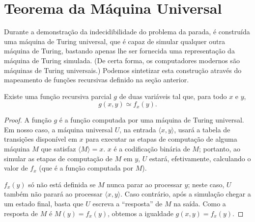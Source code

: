 \section{Teorema da Máquina Universal}
\label{sec:universal_turing_machine}

Durante a demonstração da indecidibilidade do problema da parada,
é construída uma máquina de Turing universal,
que é capaz de simular qualquer outra máquina de Turing,
bastando apenas lhe ser fornecida uma representação da máquina de Turing simulada.
(De certa forma,
os computadores modernos são máquinas de Turing universais.)
Podemos sintetizar esta construção através do mapeamento de funções recursivas
definido na seção anterior.

\begin{theorem}
    Existe uma função recursiva parcial $g$ de duas variáveis tal que,
    para todo $x$ e $y$,
    \begin{equation*}
        g(x, y) \simeq f_x(y).
    \end{equation*}
\end{theorem}

\begin{proof}
    A função $g$ é a função computada por uma máquina de Turing universal.
    Em nosso caso,
    a máquina universal $U$,
    na entrada $\langle x, y \rangle$,
    usará a tabela de transições disponível em $x$
    para executar as etapas de computação de alguma máquina $M$
    que satisfaz $\langle M \rangle = x$.
    $x$ é a codificação binária de $M$;
    portanto,
    ao simular as etapas de computação de $M$ em $y$,
    $U$ estará, efetivamente,
    calculando o valor de $f_x$ (que é a função computada por $M$).

    $f_x(y)$ só não está definida se $M$ nunca parar ao processar $y$;
    neste caso, $U$ também não parará ao processar $\langle x, y \rangle$.
    Caso contrário,
    após a simulação chegar a um estado final,
    basta que $U$ escreva a ``resposta'' de $M$ na saída.
    Como a resposta de $M$ é $M(y) = f_x(y)$,
    obtemos a igualdade $g(x, y) = f_x(y)$.
\end{proof}
